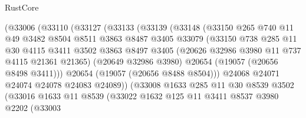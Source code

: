 \begin{lexlean}{RustCore}
\begin{coremodule}
                      (@33006
                        (@33110
                          (@33127
                            (@33133
                              (@33139
                                (@33148
                                  (@33150
                                    @265
                                    @740
                                    @11
                                    @49
                                    @3482
                                    @8504
                                    @8511
                                    @3863
                                    @8487
                                    @3405
                                    @33079
                                    (@33150
                                      @738
                                      @285
                                      @11
                                      @30
                                      @4115
                                      @3411
                                      @3502
                                      @3863
                                      @8497
                                      @3405
                                      (@20626 @32986 @3980 @11 @737 @4115 @21361 @21365)
                                      (@20649 @32986 @3980)
                                      @20654
                                      (@19057 (@20656 @8498 @3411)))
                                    @20654
                                    (@19057 (@20656 @8488 @8504)))
                                  @24068
                                  @24071
                                  @24074
                                  @24078
                                  @24083
                                  @24089))
                              (@33008
                                @1633
                                @285
                                @11
                                @30
                                @8539
                                @3502
                                (@33016
                                  @1633
                                  @11
                                  @8539
                                  (@33022
                                    @1632
                                    @125
                                    @11
                                    @3411
                                    @8537
                                    @3980
                                    @2202
                                    (@33003

\end{coremodule}
\end{lexlean}
